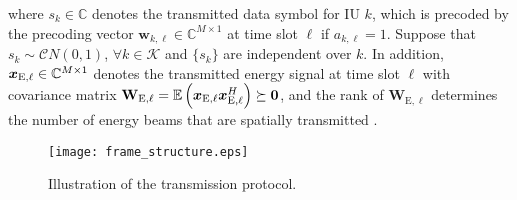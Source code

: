 \documentclass[12pt,draftclsnofoot, onecolumn]{IEEEtran}
\newcommand{\bm}[1]{\mbox{\boldmath{$#1$}}}
\theoremstyle{plain}
\begin{document}
\begin{sloppypar}
where $s_k \in\mathbb C$ denotes the transmitted data symbol for IU $k$, which is precoded by the precoding vector $\mathbf w_{k,\ell} \in\mathbb C^{M\times 1}$ at time slot $\ell$ if $a_{k,\ell} = 1$. Suppose that $s_k \sim \mathcal CN\left(0,1\right)$, $\forall k\in\mathcal K$ and $\{s_k\}$ are independent over $k$. In addition, $\bm x_{\mathrm E,\ell} \in\mathbb C^{M\times 1}$ denotes the transmitted energy signal at time slot $\ell$ with covariance matrix $\mathbf W_{\mathrm E,\ell} = \mathbb E\left(\bm x_{\mathrm E,\ell}\bm x^H_{\mathrm E,\ell}\right) \succeq \mathbf 0$, and the rank of $\mathbf W_{\mathrm E,\ell}$ determines the number of energy beams that are spatially transmitted \cite{2014_Jie_WPT}.    

\begin{figure}[!t]
	\centering
	\texttt{[image: frame\_structure.eps]}\vspace{-1.5mm}
	\caption{Illustration of the transmission protocol.}
	\label{fig:frame_structure}
	\vspace{-3mm}
\end{figure}


\end{sloppypar}
\end{document}
